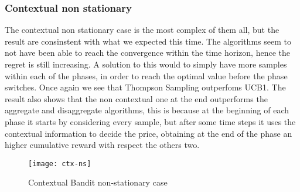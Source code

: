 \newpage
\subsubsection{Contextual non stationary}

The contextual non stationary case is the most complex of them all, but the result are consinstent with what we expected this time.
The algorithms seem to not have been able to reach the convergence within the time horizon, hence the regret is still increasing.
A solution to this would to simply have more samples within each of the phases, in order to reach the optimal value before
the phase switches. Once again we see that Thompson Sampling outperfoms UCB1.
The result also shows that the non contextual one at the end outperforms the aggregate and disaggregate algorithms, this is
because at the beginning of each phase it starts by considering every sample, but after some time steps it uses the contextual
information to decide the price, obtaining at the end of the phase an higher cumulative reward with respect the others two.

\begin{figure}[H]
	\texttt{[image: ctx-ns]}
	\caption{Contextual Bandit non-stationary case}
\end{figure}